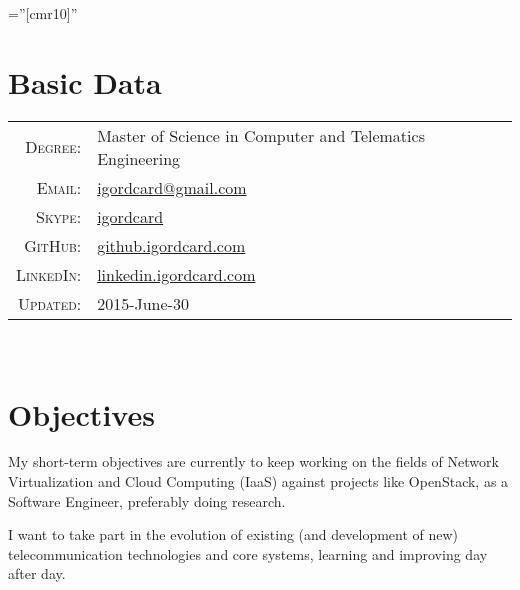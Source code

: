 \documentclass[letter,10pt]{article} %
\begin{document}
\pagestyle{empty} %

\font\fb=''[cmr10]'' %



\par{\bigskip\par} %

\section{Basic Data}

\begin{tabular}{rl}
\textsc{Degree:} & Master of Science in Computer and Telematics Engineering\\
\textsc{Email:} & \href{mailto:igordcard+cv@gmail.com}{igordcard@gmail.com}\\
\textsc{Skype:} & \href{skype:igordcard?add}{igordcard}\\
\textsc{GitHub:} & \href{http://github.igordcard.com}{github.igordcard.com}\\
\textsc{LinkedIn:} & \href{http://linkedin.igordcard.com}{linkedin.igordcard.com}\\
\textsc{Updated:} & 2015-June-30\\
\end{tabular} \\


\section{Objectives}

My short-term objectives are currently to keep working on the fields of Network Virtualization and Cloud Computing (IaaS) against projects like OpenStack, as a Software Engineer, preferably doing research.

I want to take part in the evolution of existing (and development of new) telecommunication technologies 
and core systems, learning and improving day after day. \\


\end{document}
